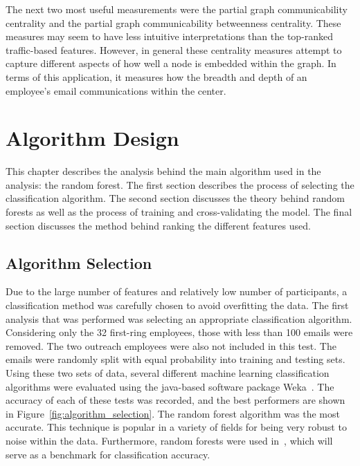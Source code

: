 \documentclass[12pt]{report}
\begin{document}
The next two most useful measurements were the partial graph communicability centrality and the partial graph communicability betweenness centrality.
These measures may seem to have less intuitive interpretations than the top-ranked traffic-based features.
However, in general these centrality measures attempt to capture different aspects of how well a node is embedded within the graph.
In terms of this application, it measures how the breadth and depth of an employee's email communications within the center.

\chapter{Algorithm Design} \label{Algorithm}
This chapter describes the analysis behind the main algorithm used in the analysis: the random forest.
The first section describes the process of selecting the classification algorithm.
The second section discusses the theory behind random forests as well as the process of training and cross-validating the model.
The final section discusses the method behind ranking the different features used.

\section{Algorithm Selection}
Due to the large number of features and relatively low number of participants, a classification method was carefully chosen to avoid overfitting the data.
The first analysis that was performed was selecting an appropriate classification algorithm.
Considering only the 32 first-ring employees, those with less than 100 emails were removed.
The two outreach employees were also not included in this test.
The emails were randomly split with equal probability into training and testing sets.
Using these two sets of data, several different machine learning classification algorithms were evaluated using the java-based software package Weka~\cite{hall2009weka}.
The accuracy of each of these tests was recorded, and the best performers are shown in Figure~\ref{fig:algorithm_selection}.
The random forest algorithm was the most accurate.
This technique is popular in a variety of fields for being very robust to noise within the data.
Furthermore, random forests were used in~\cite{namata_inferring_2006}, which will serve as a benchmark for classification accuracy.
\end{document}
